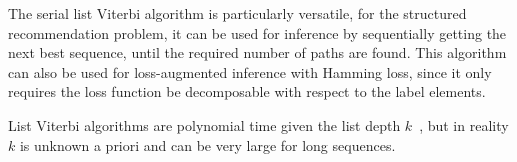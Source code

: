 The serial list Viterbi algorithm is particularly versatile, 
for the structured recommendation problem, %
it can be used for inference by sequentially getting the next best sequence, until the required number of %
paths are found.
This algorithm can also be used for loss-augmented inference with Hamming loss,
since it only requires the loss function be decomposable with respect to the label elements.


%
List Viterbi algorithms are polynomial time given the list depth $k$~\cite{nilsson2001sequentially},
but in reality $k$ is unknown a priori and can be very large for long sequences.
